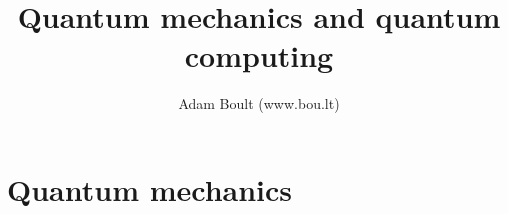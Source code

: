 \documentclass[oneside]{book}
\begin{document}
\author{Adam Boult (www.bou.lt)}
\title{Quantum mechanics and quantum computing}
\maketitle

\setcounter{tocdepth}{0}
\tableofcontents



\part{Quantum mechanics}



\end{document}
